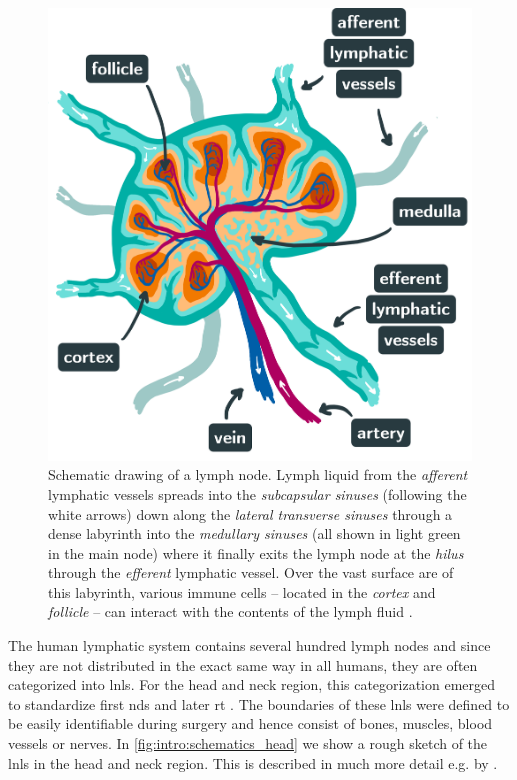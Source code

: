 \documentclass[\relativeRoot/main.tex]{subfiles}
\begin{document}
\begin{figure}
    \begin{minipage}[c]{0.6\textwidth}
        \includegraphics[width=\textwidth]{figures/lymph-node_labelled.png}
    \end{minipage}
    \hfill
    \begin{minipage}[c]{0.38\textwidth}
        \caption[
            Lymph node schematic
        ]{
            Schematic drawing of a lymph node. Lymph liquid from the \emph{afferent} lymphatic vessels spreads into the \emph{subcapsular sinuses} (following the white arrows) down along the \emph{lateral transverse sinuses} through a dense labyrinth into the \emph{medullary sinuses} (all shown in light green in the main node) where it finally exits the lymph node at the \emph{hilus} through the \emph{efferent} lymphatic vessel. Over the vast surface are of this labyrinth, various immune cells -- located in the \emph{cortex} and \emph{follicle} -- can interact with the contents of the lymph fluid \cite{willard-mack_normal_2006,ohtani_structure_2008}.
        }
    \end{minipage}
    \label{fig:intro:lymph-node}
\end{figure}

The human lymphatic system contains several hundred lymph nodes \cite{willard-mack_normal_2006} and since they are not distributed in the exact same way in all humans, they are often categorized into \glspl{lnl}. For the head and neck region, this categorization emerged to standardize first \glspl{nd} \cite{robbins_standardizing_1991} and later \gls{rt} \cite{gregoire_ct-based_2003}. The boundaries of these \glspl{lnl} were defined to be easily identifiable during surgery and hence consist of bones, muscles, blood vessels or nerves. In \cref{fig:intro:schematics_head} we show a rough sketch of the \glspl{lnl} in the head and neck region. This is described in much more detail e.g. by .
\end{document}
